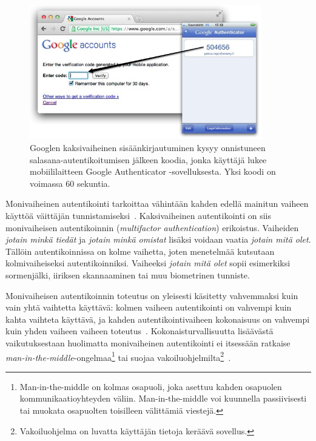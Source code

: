 \documentclass[finnish,gradu]{tktltiki}
\begin{document}
  \begin{figure}
    \centering
    \includegraphics[width=0.9\textwidth]{images/google_authenticator.jpg}
    \caption{Googlen kaksivaiheinen sisäänkirjautuminen kysyy onnistuneen salasana-autentikoitumisen jälkeen koodia, jonka käyttäjä lukee mobiililaitteen Google Authenticator -sovelluksesta. Yksi koodi on voimassa 60 sekuntia.}
    \label{fig:google_authenticator}
  \end{figure}

  Monivaiheinen autentikointi tarkoittaa vähintään kahden edellä mainitun vaiheen käyttöä väittäjän tunnistamiseksi~\cite{NIST_SP800-63-1}. Kaksivaiheinen autentikointi on siis monivaiheisen autentikoinnin (\emph{multifactor authentication}) erikoistus. Vaiheiden \emph{jotain minkä tiedät} ja \emph{jotain minkä omistat} lisäksi voidaan vaatia \emph{jotain mitä olet}. Tällöin autentikoinnissa on kolme vaihetta, joten menetelmää kutsutaan kolmivaiheiseksi autentikoinniksi. Vaiheeksi \emph{jotain mitä olet} sopii esimerkiksi sormenjälki, iiriksen skannaaminen tai muu biometrinen tunniste.

  Monivaiheisen autentikoinnin toteutus on yleisesti käsitetty vahvemmaksi kuin vain yhtä vaihtetta käyttävä: kolmen vaiheen autentikointi on vahvempi kuin kahta vaihteta käyttävä, ja kahden autentikointivaiheen kokonaisuus on vahvempi kuin yhden vaiheen vaiheen toteutus~\cite{NIST_SP800-63-1}. Kokonaisturvallisuutta lisäävästä vaikutuksestaan huolimatta monivaiheinen autentikointi ei itsessään ratkaise \emph{man-in-the-middle}-ongelmaa\footnote{
  Man-in-the-middle on kolmas osapuoli, joka asettuu kahden osapuolen kommunikaatioyhteyden väliin. Man-in-the-middle voi kuunnella passiivisesti tai muokata osapuolten toisilleen välittämiä viestejä.}
tai suojaa vakoiluohjelmilta\footnote{Vakoiluohjelma on luvatta käyttäjän tietoja keräävä sovellus.}~\cite{schneier_2factor_2005}.
\end{document}
